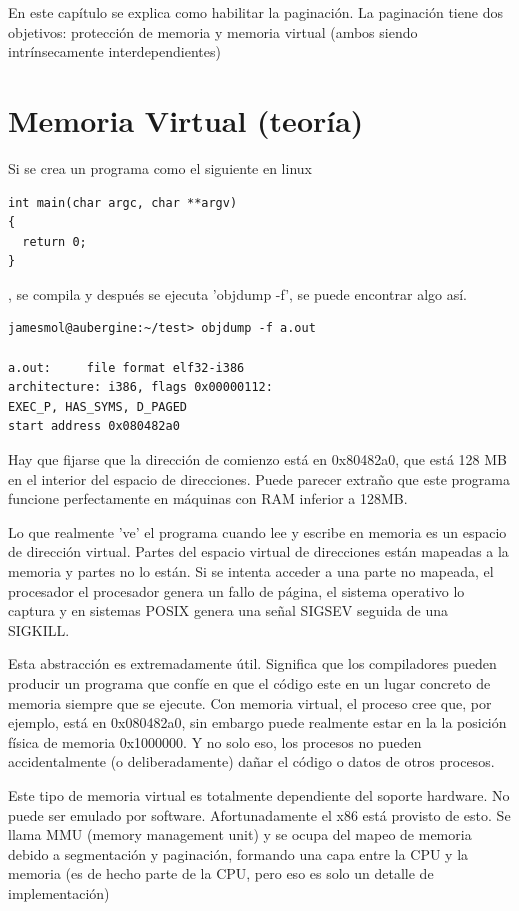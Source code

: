 \documentclass{report}
\begin{document}
En este capítulo se explica como habilitar la paginación. La paginación tiene dos objetivos: protección de memoria y memoria virtual (ambos siendo intrínsecamente interdependientes)

\section{Memoria Virtual (teoría)}

Si se crea un programa como el siguiente en linux

\begin{lstlisting}
int main(char argc, char **argv)
{
  return 0;
}
\end{lstlisting}
, se compila y después se ejecuta 'objdump -f', se puede encontrar algo así.

\begin{lstlisting}
jamesmol@aubergine:~/test> objdump -f a.out

a.out:     file format elf32-i386
architecture: i386, flags 0x00000112:
EXEC_P, HAS_SYMS, D_PAGED
start address 0x080482a0
\end{lstlisting}

Hay que fijarse que la dirección de comienzo está en 0x80482a0, que está 128 MB en el interior del espacio de direcciones. Puede parecer extraño que este programa funcione perfectamente en máquinas con RAM inferior a 128MB.

Lo que realmente 've' el programa cuando lee y escribe en memoria es un espacio de dirección virtual. Partes del espacio virtual de direcciones están mapeadas a la memoria y partes no lo están. Si se intenta acceder a una parte no mapeada, el procesador el procesador genera un fallo de página, el sistema operativo lo captura y en sistemas POSIX genera una señal SIGSEV seguida de una SIGKILL.

Esta abstracción es extremadamente útil. Significa que los compiladores pueden producir un programa que confíe en que el código este en un lugar concreto de memoria siempre que se ejecute. Con memoria virtual, el proceso cree que, por ejemplo, está en 0x080482a0, sin embargo puede realmente estar en la la posición física de memoria 0x1000000. Y no solo eso, los procesos no pueden accidentalmente (o deliberadamente) dañar el código o datos de otros procesos.

Este tipo de memoria virtual es totalmente dependiente del soporte hardware. No puede ser emulado por software. Afortunadamente el x86 está provisto de esto. Se llama MMU (memory management unit) y se ocupa del mapeo de memoria debido a segmentación y paginación, formando una capa entre la CPU y la memoria (es de hecho parte de la CPU, pero eso es solo un detalle de implementación)
\end{document}
